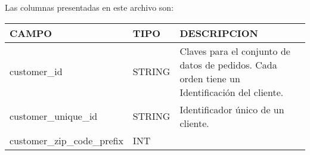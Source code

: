 \documentclass[11pt]{article}
\begin{document}
Las columnas presentadas en este archivo son:

\begin{longtable}[]{@{}llll@{}}
\toprule
\begin{minipage}[b]{0.22\columnwidth}\raggedright
CAMPO\strut
\end{minipage} & \begin{minipage}[b]{0.22\columnwidth}\raggedright
TIPO\strut
\end{minipage} & \begin{minipage}[b]{0.22\columnwidth}\raggedright
DESCRIPCION\strut
\end{minipage} & \begin{minipage}[b]{0.22\columnwidth}\raggedright
\strut
\end{minipage}\tabularnewline
\midrule
\endhead
\begin{minipage}[t]{0.22\columnwidth}\raggedright
customer\_id\strut
\end{minipage} & \begin{minipage}[t]{0.22\columnwidth}\raggedright
STRING\strut
\end{minipage} & \begin{minipage}[t]{0.22\columnwidth}\raggedright
Claves para el conjunto de datos de pedidos. Cada orden tiene un
Identificación del cliente.\strut
\end{minipage} & \begin{minipage}[t]{0.22\columnwidth}\raggedright
\strut
\end{minipage}\tabularnewline
\begin{minipage}[t]{0.22\columnwidth}\raggedright
customer\_unique\_id\strut
\end{minipage} & \begin{minipage}[t]{0.22\columnwidth}\raggedright
STRING\strut
\end{minipage} & \begin{minipage}[t]{0.22\columnwidth}\raggedright
Identificador único de un cliente.\strut
\end{minipage} & \begin{minipage}[t]{0.22\columnwidth}\raggedright
\strut
\end{minipage}\tabularnewline
\begin{minipage}[t]{0.22\columnwidth}\raggedright
customer\_zip\_code\_prefix\strut
\end{minipage} & \begin{minipage}[t]{0.22\columnwidth}\raggedright
INT\strut
\end{minipage} & \begin{minipage}[t]{0.22\columnwidth}\raggedright

\end{minipage}
\end{longtable}
\end{document}

